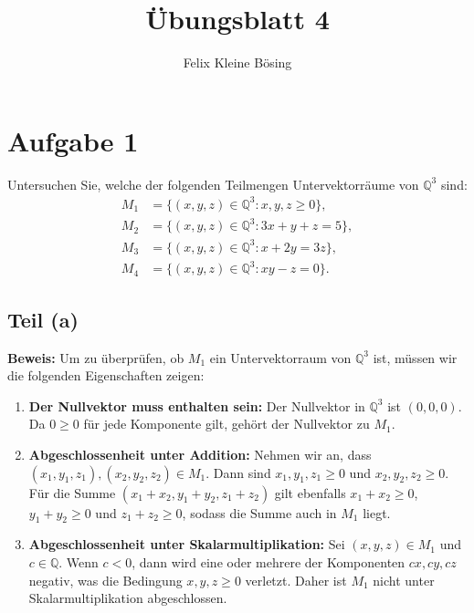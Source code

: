 \documentclass[11pt]{article}
\begin{document}
\title{Übungsblatt 4}
\author{Felix Kleine Bösing}
\maketitle

\section*{Aufgabe 1}

Untersuchen Sie, welche der folgenden Teilmengen Untervektorräume von \( \mathbb{Q}^3 \) sind:
\[
\begin{aligned}
    M_1 &= \{(x, y, z) \in \mathbb{Q}^3 : x, y, z \geq 0\}, \\
    M_2 &= \{(x, y, z) \in \mathbb{Q}^3 : 3x + y + z = 5\}, \\
    M_3 &= \{(x, y, z) \in \mathbb{Q}^3 : x + 2y = 3z\}, \\
    M_4 &= \{(x, y, z) \in \mathbb{Q}^3 : xy - z = 0\}.
\end{aligned}
\]

\subsection*{Teil (a)}

\textbf{Beweis:} Um zu überprüfen, ob \( M_1 \) ein Untervektorraum von \( \mathbb{Q}^3 \) ist, müssen wir die folgenden Eigenschaften zeigen:

\begin{enumerate}
    \item \textbf{Der Nullvektor muss enthalten sein:} Der Nullvektor in \( \mathbb{Q}^3 \) ist \((0, 0, 0)\). Da \(0 \geq 0\) für jede Komponente gilt, gehört der Nullvektor zu \( M_1 \).

    \item \textbf{Abgeschlossenheit unter Addition:} Nehmen wir an, dass \( (x_1, y_1, z_1), (x_2, y_2, z_2) \in M_1 \). Dann sind \( x_1, y_1, z_1 \geq 0 \) und \( x_2, y_2, z_2 \geq 0 \). Für die Summe \((x_1 + x_2, y_1 + y_2, z_1 + z_2)\) gilt ebenfalls \( x_1 + x_2 \geq 0 \), \( y_1 + y_2 \geq 0 \) und \( z_1 + z_2 \geq 0 \), sodass die Summe auch in \( M_1 \) liegt.

    \item \textbf{Abgeschlossenheit unter Skalarmultiplikation:} Sei \( (x, y, z) \in M_1 \) und \( c \in \mathbb{Q} \). Wenn \( c < 0 \), dann wird eine oder mehrere der Komponenten \( cx, cy, cz \) negativ, was die Bedingung \( x, y, z \geq 0 \) verletzt. Daher ist \( M_1 \) nicht unter Skalarmultiplikation abgeschlossen.
\end{enumerate}
\end{document}
